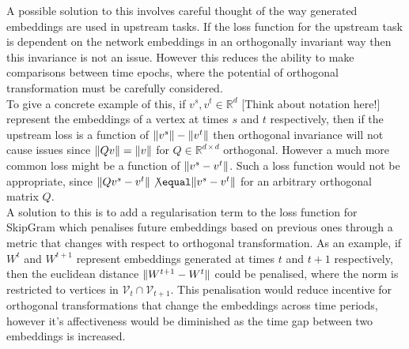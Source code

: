 \documentclass[a4paper]{article}
\renewcommand{\V}{\mathcal V}
\begin{document}
A possible solution to this involves careful thought of the way generated embeddings are used in upstream tasks. If the loss function for the upstream task
is dependent on the network embeddings in an orthogonally invariant way then this invariance is not an issue. However this reduces the ability to
make comparisons between time epochs, where the potential of orthogonal transformation must be carefully considered.\\
To give a concrete example of this,  if $v^s, v^t \in \mathbb{R}^d$ [Think about notation here!] represent the embeddings of a vertex at times $s$ and $t$ respectively, then
if the upstream loss is a function of $\lVert v^s\rVert-\lVert v^t\rVert$ then orthogonal invariance will not cause issues since $\lVert Qv\rVert = \lVert v\rVert$ for $Q \in \mathbb{R}^{d \times d}$ orthogonal.
However a much more common loss might be a function of $\lVert v^s - v^t\rVert$. Such a loss function would not be appropriate, since $\norm{Qv^s - v^t} \not\equal \norm{v^s - v^t}$ for an arbitrary
orthogonal matrix $Q$.\\
A solution to this is to add a regularisation term to the loss function for SkipGram which penalises future embeddings based on previous ones through a metric that changes with respect to orthogonal
transformation. As an example, if $W^t$ and $W^{t+1}$ represent embeddings generated at times $t$ and $t+1$ respectively, then the euclidean distance $\lVert W^{t+1} - W^t\rVert$ could be penalised,
where the norm is restricted to vertices in $\V_t \cap \V_{t+1}$. This penalisation would reduce incentive for orthogonal transformations that change the embeddings across time periods, however it's
affectiveness would be diminished as the time gap between two embeddings is increased.
\end{document}
